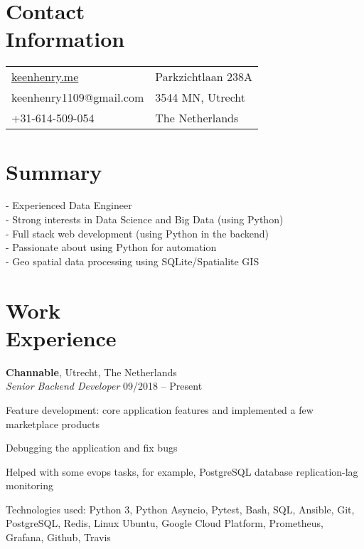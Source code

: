 \documentclass[margin,line]{resume}
\begin{document}
\begin{resume}

    \section{\myheadingstyle Contact \\ Information}
      \begin{tabular}{@{}p{7cm}p{6cm}}
      \url{keenhenry.me}      & Parkzichtlaan 238A \\
      keenhenry1109@gmail.com & 3544 MN, Utrecht \\
      +31-614-509-054        & The Netherlands \\
      \end{tabular}
 
    \section{\myheadingstyle Summary}
      - Experienced Data Engineer \\
      - Strong interests in Data Science and Big Data (using Python) \\
      - Full stack web development (using Python in the backend) \\
      - Passionate about using Python for automation \\
      - Geo spatial data processing using SQLite/Spatialite GIS \\
    \vspace{-5mm}

    \section{\myheadingstyle Work \\ Experience}
    \textbf{Channable}, Utrecht, The Netherlands \\
    \textsl{Senior Backend Developer} \hfill 09/2018 -- Present \vspace{-3mm}\\\vspace{-1mm}%
      \begin{list2}
      \item Feature development: core application features and implemented a few marketplace products
      \item Debugging the application and fix bugs
      \item Helped with some evops tasks, for example, PostgreSQL database replication-lag monitoring
      \item Technologies used: Python 3, Python Asyncio, Pytest, Bash, SQL, Ansible, Git, PostgreSQL, Redis, Linux Ubuntu,
            Google Cloud Platform, Prometheus, Grafana, Github, Travis
      \end{list2}


\end{resume}
\end{document}
